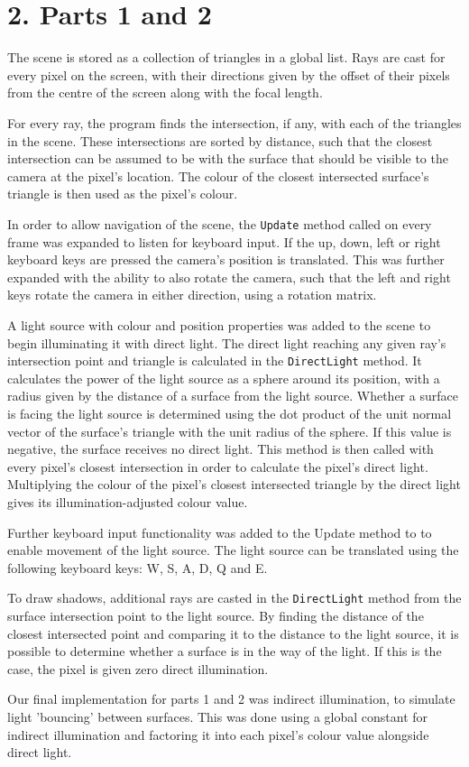 \documentclass[DIV=calc, paper=a4, fontsize=11pt, twocolumn]{article}	 %
\begin{document}
	\section*{2. Parts 1 and 2}
	The scene is stored as a collection of triangles in a global list. Rays are cast for every pixel on the screen, with their directions given by the offset of their pixels from the centre of the screen along with the focal length. \par
	For every ray, the program finds the intersection, if any, with each of the triangles in the scene. These intersections are sorted by distance, such that the closest intersection can be assumed to be with the surface that should be visible to the camera at the pixel's location. The colour of the closest intersected surface's triangle is then used as the pixel's colour. \par
	In order to allow navigation of the scene, the \texttt{Update} method called on every frame was expanded to listen for keyboard input. If the up, down, left or right keyboard keys are pressed the camera's position is translated. This was further expanded with the ability to also rotate the camera, such that the left and right keys rotate the camera in either direction, using a rotation matrix. \par
	A light source with colour and position properties was added to the scene to begin illuminating it with direct light. The direct light reaching any given ray's intersection point and triangle is calculated in the \texttt{DirectLight} method. It calculates the power of the light source as a sphere around its position, with a radius given by the distance of a surface from the light source. Whether a surface is facing the light source is determined using the dot product of the unit normal vector of the surface's triangle with the unit radius of the sphere. If this value is negative, the surface receives no direct light. This method is then called with every pixel's closest intersection in order to calculate the pixel's direct light. Multiplying the colour of the pixel's closest intersected triangle by the direct light gives its illumination-adjusted colour value. \par
	Further keyboard input functionality was added to the Update method to to enable movement of the light source. The light source can be translated using the following keyboard keys: W, S, A, D, Q and E. \par
	To draw shadows, additional rays are casted in the \texttt{DirectLight} method from the surface intersection point to the light source. By finding the distance of the closest intersected point and comparing it to the distance to the light source, it is possible to determine whether a surface is in the way of the light. If this is the case, the pixel is given zero direct illumination. \par
	Our final implementation for parts 1 and 2 was indirect illumination, to simulate light 'bouncing' between surfaces. This was done using a global constant for indirect illumination and factoring it into each pixel's colour value alongside direct light. 
		
\end{document}

